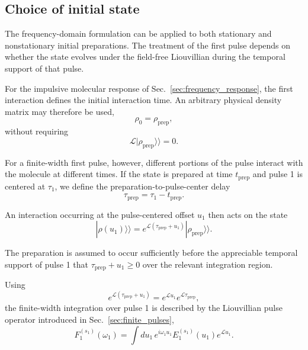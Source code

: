 \documentclass[11pt]{article}
\begin{document}
\subsection{Choice of initial state}
\label{subsec:dimer_initial_state}

The frequency-domain formulation can be applied to both stationary and
nonstationary initial preparations.  The treatment of the first pulse
depends on whether the state evolves under the field-free Liouvillian
during the temporal support of that pulse.

For the impulsive molecular response of
Sec.~\ref{sec:frequency_response}, the first interaction defines the
initial interaction time.  An arbitrary physical density matrix may
therefore be used,
%
\begin{equation}
\rho_0
=
\rho_{\mathrm{prep}},
\end{equation}
%
without requiring
%
\begin{equation}
\mathcal{L}
|\rho_{\mathrm{prep}}\rangle\rangle
=
0.
\end{equation}

For a finite-width first pulse, however, different portions of the
pulse interact with the molecule at different times.  If the state is
prepared at time $t_{\mathrm{prep}}$ and pulse 1 is centered at
$\tau_1$, we define the preparation-to-pulse-center delay
%
\begin{equation}
\boxed{
\tau_{\mathrm{prep}}
=
\tau_1-t_{\mathrm{prep}}.
}
\label{eq:preparation_delay}
\end{equation}

An interaction occurring at the pulse-centered offset $u_1$ then acts
on the state
%
\begin{equation}
\boxed{
|\rho(u_1)\rangle\rangle
=
e^{\mathcal{L}(\tau_{\mathrm{prep}}+u_1)}
|\rho_{\mathrm{prep}}\rangle\rangle .
}
\label{eq:prepared_state_during_pulse1}
\end{equation}

The preparation is assumed to occur sufficiently before the
appreciable temporal support of pulse 1 that
$\tau_{\mathrm{prep}}+u_1\geq0$ over the relevant integration region.

Using
%
\begin{equation}
e^{\mathcal{L}(\tau_{\mathrm{prep}}+u_1)}
=
e^{\mathcal{L}u_1}
e^{\mathcal{L}\tau_{\mathrm{prep}}},
\end{equation}
%
the finite-width integration over pulse 1 is described by the
Liouvillian pulse operator introduced in
Sec.~\ref{sec:finite_pulses},
%
\begin{equation}
F_1^{(s_1)}(\omega_1)
=
\int du_1\,
e^{i\omega_1u_1}
E_1^{(s_1)}(u_1)
e^{\mathcal{L}u_1}.
\end{equation}
\end{document}
